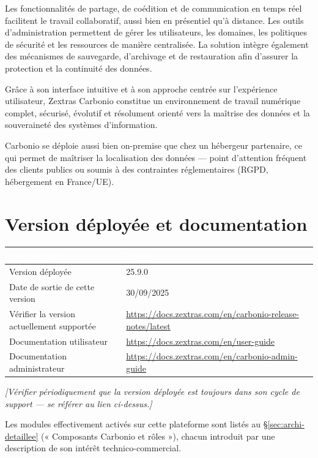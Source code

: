 \documentclass[11pt,a4paper]{report}
\newcommand{\placeholder}[1]{\textit{\textcolor{placeholdercol}{[#1]}}\par\vspace{4pt}}
\newcommand{\tblhead}[1]{\textcolor{white}{\textbf{#1}}}
\begin{document}
Les fonctionnalités de partage, de coédition et de communication en temps réel facilitent le travail collaboratif, aussi bien en présentiel qu'à distance. Les outils d'administration permettent de gérer les utilisateurs, les domaines, les politiques de sécurité et les ressources de manière centralisée. La solution intègre également des mécanismes de sauvegarde, d'archivage et de restauration afin d'assurer la protection et la continuité des données.

Grâce à son interface intuitive et à son approche centrée sur l'expérience utilisateur, Zextras Carbonio constitue un environnement de travail numérique complet, sécurisé, évolutif et résolument orienté vers la maîtrise des données et la souveraineté des systèmes d'information.

Carbonio se déploie aussi bien on-premise que chez un hébergeur partenaire, ce qui permet de maîtriser la localisation des données --- point d'attention fréquent des clients publics ou soumis à des contraintes réglementaires (RGPD, hébergement en France/UE).

\section{Version déployée et documentation}
\begin{longtable}{|p{4.5cm}|p{8.5cm}|}
\hline
\rowcolor{primary}\tblhead{Information} & \tblhead{Valeur} \\
\hline
\endhead
Version déployée & 25.\allowbreak{}9.\allowbreak{}0 \\
\hline
Date de sortie de cette version & 30/09/2025 \\
\hline
Vérifier la version actuellement supportée & \url{https://docs.zextras.com/en/carbonio-release-notes/latest } \\
\hline
Documentation utilisateur & \url{https://docs.zextras.com/en/user-guide } \\
\hline
Documentation administrateur & \url{https://docs.zextras.com/en/carbonio-admin-guide } \\
\hline
\end{longtable}
\placeholder{Vérifier périodiquement que la version déployée est toujours dans son cycle de support --- se référer au lien ci-dessus.}

Les modules effectivement activés sur cette plateforme sont listés au \S\ref{sec:archi-detaillee} (« Composants Carbonio et rôles »), chacun introduit par une description de son intérêt technico-commercial.
\end{document}
